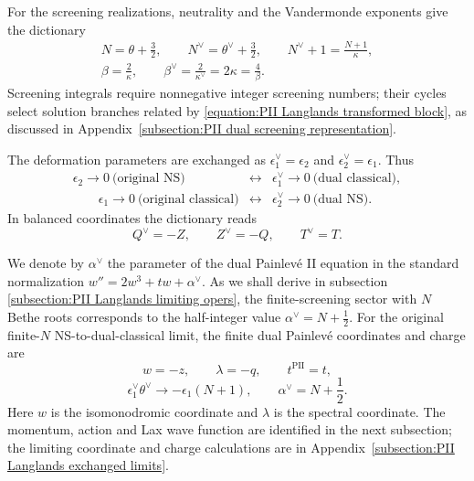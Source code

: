 \documentclass[a4paper,11pt]{article}
\numberwithin{equation}{section}
\begin{document}
For the screening realizations, neutrality and the Vandermonde
exponents give the dictionary
\begin{equation}
	\label{equation:PII Langlands dual screening number}
	\begin{gathered}
		N=\theta+\frac{3}{2},\qquad
		N^{\vee}=\theta^{\vee}+\frac{3}{2},\qquad
		N^{\vee}+1=\frac{N+1}{\kappa},\\
		\beta=\frac{2}{\kappa},\qquad
		\beta^{\vee}=\frac{2}{\kappa^{\vee}}
		=2\kappa=\frac{4}{\beta}.
	\end{gathered}
\end{equation}
Screening integrals require nonnegative integer screening numbers;
their cycles select solution branches related by
\eqref{equation:PII Langlands transformed block}, as discussed in
Appendix~\ref{subsection:PII dual screening representation}.

The deformation parameters are exchanged as
$\epsilon_{1}^{\vee}=\epsilon_{2}$ and
$\epsilon_{2}^{\vee}=\epsilon_{1}$.  Thus
\begin{equation}
	\label{equation:PII Langlands limit dictionary}
	\begin{array}{ccl}
		\epsilon_{2}\to0\ \text{(original NS)}
		&\longleftrightarrow&\epsilon_{1}^{\vee}\to0\ \text{(dual classical)},\\ \qquad
		\epsilon_{1}\to0\ \text{(original classical)}
		&\longleftrightarrow&\epsilon_{2}^{\vee}\to0\ \text{(dual NS)}.
	\end{array}
\end{equation}
In balanced coordinates the dictionary reads
\begin{equation}
	Q^{\vee}=-Z,\qquad Z^{\vee}=-Q,\qquad T^{\vee}=T.
\end{equation}

We denote by $\alpha^\vee$ the parameter of the dual Painlev\'e II equation in the standard normalization $w''=2w^3+tw+\alpha^\vee$. As we shall derive in subsection \ref{subsection:PII Langlands limiting opers}, the finite-screening sector with $N$ Bethe roots corresponds to the half-integer value $\alpha^\vee=N+\frac12$.
For the original finite-$N$ NS-to-dual-classical limit, the finite
dual Painlev\'e coordinates and charge are
\begin{equation}
	\label{equation:PII Langlands unscaled coordinate exchange}
	w=-z,\qquad \lambda=-q,\qquad t^{\mathrm{PII}}=t,
\end{equation}
\begin{equation}
	\label{equation:PII Langlands reverse classical charge}
	\epsilon_{1}^{\vee}\theta^{\vee}
	\longrightarrow-\epsilon_{1}(N+1),\qquad
	\alpha^{\vee}=N+\frac{1}{2}.
\end{equation}
Here $w$ is the isomonodromic coordinate and $\lambda$ is the
spectral coordinate.  The momentum, action and Lax wave function
are identified in the next subsection; the limiting coordinate
and charge calculations are in
Appendix~\ref{subsection:PII Langlands exchanged limits}.
\end{document}
